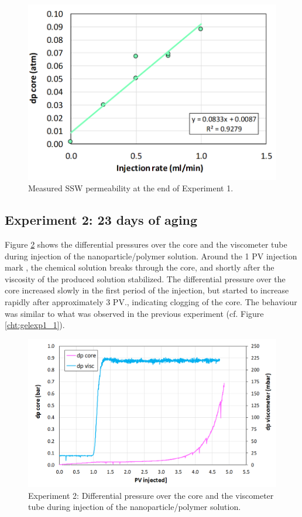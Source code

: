 \begin{figure}[h!]
    \centering
    \includegraphics[width=\textwidth]{img/cht/gelexp1_4.png}
    \caption{Measured SSW permeability at the end of Experiment 1.}
    \label{cht:gelexp1_4} %
\end{figure}

\FloatBarrier
\subsection{Experiment 2: 23 days of aging}
Figure \ref{cht:gelexp2_1} shows the differential pressures over the core and the viscometer tube during injection of the nanoparticle/polymer solution. Around the 1 PV injection mark , the chemical solution breaks through the core, and shortly after the viscosity of the produced solution stabilized. The differential pressure over the core increased slowly in the first period of the injection, but started to increase rapidly after approximately 3 PV., indicating clogging of the core. The behaviour was similar to what was observed in the previous experiment (cf. Figure \ref{cht:gelexp1_1}).

\begin{figure}[h!]
    \centering
    \includegraphics[width=\textwidth]{img/cht/gelexp2_1.png}
    \caption{Experiment 2: Differential pressure over the core and the viscometer tube during injection of the nanoparticle/polymer solution.}
    \label{cht:gelexp2_1} %
\end{figure}

